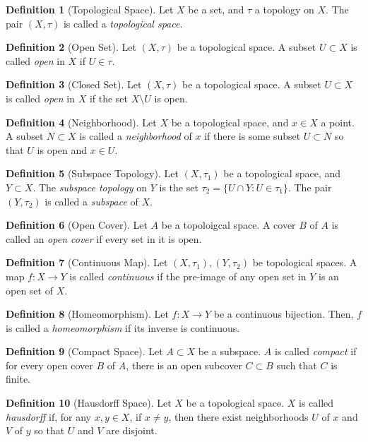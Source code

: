 \documentclass{article}
\theoremstyle{definition}
\newtheorem{definition}{Definition}[subsection]
\theoremstyle{theorem}
\begin{document}
    \begin{definition}[Topological Space]
        Let $X$ be a set, and $\tau$ a topology on $X$. The pair $(X,\tau)$ is called a \textit{topological space}.        
    \end{definition}
    \begin{definition}[Open Set]
        Let $(X,\tau)$ be a topological space. A subset $U\subset X$ is called \textit{open} in $X$ if $U\in \tau$.
    \end{definition}
    \begin{definition}[Closed Set]
        Let $(X,\tau)$ be a topological space. A subset $U\subset X$ is called \textit{open} in $X$ if the set $X \setminus U$ is  open.
    \end{definition}
    \begin{definition}[Neighborhood]
        Let $X$ be a topological space, and $x\in X$ a point. A subset $N\subset X$ is called a \textit{neighborhood} of $x$ if there is some subset $U\subset N$ so that $U$ is open and $x\in U$.
    \end{definition}
    \begin{definition}[Subspace Topology]
        Let $(X,\tau_1)$ be a topological space, and $Y\subset X$. The \textit{subspace topology} on $Y$ is the set $\tau_2=\{U\cap Y : U \in \tau_1\}$. The pair $(Y,\tau_2)$ is called a \textit{subspace} of $X$.
    \end{definition}
    \begin{definition}[Open Cover]
        Let $A$ be a topoloigcal space. A cover $B$ of $A$ is called an \textit{open cover} if every set in it is open.
    \end{definition}
    \begin{definition}[Continuous Map]
        Let $(X,\tau_1),(Y,\tau_2)$ be topological spaces. A map $f:X\rightarrow Y$ is called \textit{continuous} if the pre-image of any open set in $Y$ is an open set of $X$.
    \end{definition}
    \begin{definition}[Homeomorphism]
        Let $f:X\rightarrow Y$ be a continuous bijection. Then, $f$ is called a \textit{homeomorphism} if its inverse is continuous. 
    \end{definition}
    \begin{definition}[Compact Space]
        Let $A\subset X$ be a subspace. $A$ is called \textit{compact} if for every open cover $B$ of $A$, there is an open subcover $C\subset B$ such that $C$ is finite.
    \end{definition}
    \begin{definition}[Hausdorff Space]
        Let $X$ be a topological space. $X$ is called \textit{hausdorff} if, for any $x,y\in X$, if $x\neq y$, then there exist neighborhoods $U$ of $x$ and $V$ of $y$ so that $U$ and $V$ are disjoint.
    \end{definition}
\end{document}
